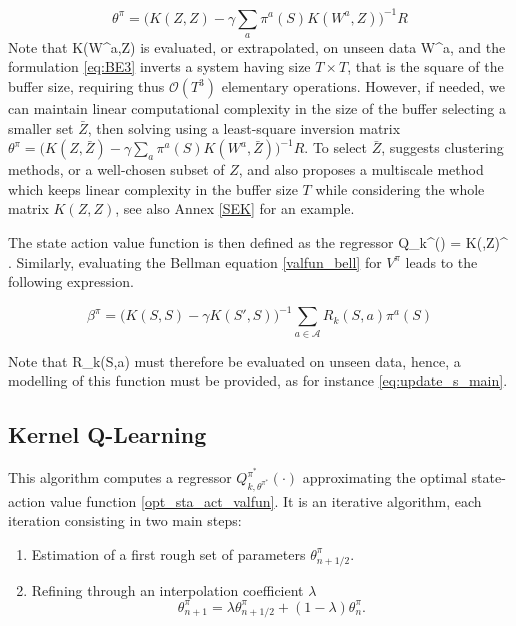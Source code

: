 \documentclass[
]{article}
\def\({}%
\def\){}%
\numberwithin{equation}{section}
\begin{document}
\begin{equation} \label{eq:BE3}
\theta^\pi = \Big( K(Z, Z) - \gamma \sum_a \pi^a(S) K(W^a,Z)\Big)^{-1} R 
\end{equation}
Note that \(K(W^a,Z)\) is evaluated, or extrapolated, on unseen data \(W^a\), and the formulation \eqref{eq:BE3} inverts a system having size $T \times T$, that is the square of the buffer size, requiring thus $\mathcal{O}(T^3)$ elementary operations. However, if needed, we can maintain linear computational complexity in the size of the buffer selecting a smaller set $\bar{Z}$, then solving using a least-square inversion matrix $\theta^\pi = \Big( K(Z, \bar{Z}) - \gamma \sum_a \pi^a(S) K(W^a,\bar{Z})\Big)^{-1} R$. To select $\bar{Z}$, \cite{LeMeMi:2024} suggests clustering methods, or a well-chosen subset of $Z$, and also proposes a multiscale method which keeps linear complexity in the buffer size $T$ while considering the whole matrix $K(Z, Z)$, see also Annex \ref{SEK} for an example.

The state action value function is then defined as the regressor
\(Q_k^{\pi}(\cdot) = K(\cdot,Z)\theta^{\pi} \). Similarly, evaluating the Bellman equation
\eqref{valfun_bell} for $V^\pi$ leads to the following expression.

\begin{equation} \label{eq:BE4}
 \beta^\pi = \Big(K(S, S) - \gamma K(S', S) \Big)^{-1} \sum_{a \in \mathcal{A}} R_k(S,a)\pi^a (S)
\end{equation} 

Note that \(R_k(S,a)\) must therefore be evaluated on
unseen data, hence, a modelling of this function must be provided, as for
instance \eqref{eq:update_s_main}.


\hypertarget{Kernel Q-Learning}{%
\subsection{Kernel Q-Learning}\label{Kernel Q-Learning}}

This algorithm computes a regressor $Q^{\pi^*}_{k,\theta^{\pi^*}}(\cdot)$ approximating the optimal state-action value function \eqref{opt_sta_act_valfun}. It is an iterative algorithm, each iteration consisting in two main steps:  

\begin{enumerate}
\item Estimation of a first rough set of parameters $\theta^{\pi}_{n+1/2}$.
\item Refining through an interpolation coefficient $\lambda$
$$
\theta_{n+1}^{\pi} = \lambda \theta^{\pi}_{n+1/2} + (1 - \lambda) \theta_{n}^{\pi}.
$$
\end{enumerate}
\end{document}
